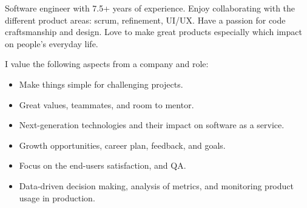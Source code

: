 \setlength{\columnsep}{0.5cm}

\begin{cvparagraph}

Software engineer with 7.5+ years of experience. Enjoy collaborating with the different product areas: scrum, refinement, UI/UX. Have a passion for code craftsmanship and design. Love to make great products especially which impact on people's everyday life.

I value the following aspects from a company and role:\\
\begin{minipage}{0.46\textwidth}
    \begin{itemize}
        \item {Make things simple for challenging projects.} 
        \item {Great values, teammates, and room to mentor.}
        \item {Next-generation technologies and their impact on software as a service.}
    \end{itemize}
\end{minipage}%
\hfill
\begin{minipage}{0.54\textwidth}
    \begin{itemize}
        \item {Growth opportunities, career plan, feedback, and goals.}
        \item {Focus on the end-users satisfaction, and QA.}
        \item {Data-driven decision making, analysis of metrics, and monitoring product usage in production.}
    \end{itemize}
\end{minipage}%
 
\end{cvparagraph}